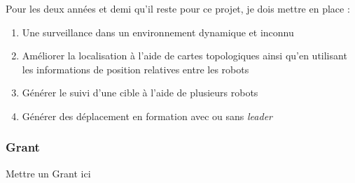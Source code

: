 Pour les deux années et demi qu'il reste pour ce projet, je dois mettre en place :
\begin{enumerate}
\item Une surveillance dans un environnement dynamique et inconnu
\item Améliorer la localisation à l'aide de cartes topologiques ainsi qu'en utilisant les informations de position relatives entre les robots
\item Générer le suivi d'une cible à l'aide de plusieurs robots
\item Générer des déplacement en formation avec ou sans \emph{leader}
\end{enumerate}

\subsubsection{Grant}

Mettre un Grant ici \dag